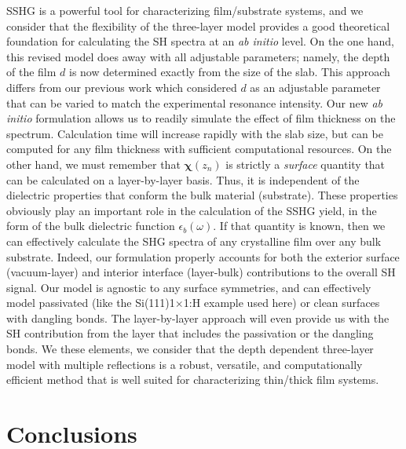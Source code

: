 \documentclass[utf8]{frontiersSCNS}
\begin{document}
SSHG is a powerful tool for characterizing film/substrate systems, and we
consider that the flexibility of the three-layer model provides a good
theoretical foundation for calculating the SH spectra at an \emph{ab initio}
level. On the one hand, this revised model does away with all adjustable
parameters; namely, the depth of the film $d$ is now determined exactly from the
size of the slab. This approach differs from our previous work
\citep{andersonPRB16b} which considered $d$ as an adjustable parameter that can
be varied to match the experimental resonance intensity. Our new \emph{ab
initio} formulation allows us to readily simulate the effect of film thickness
on the spectrum. Calculation time will increase rapidly with the slab size, but
can be computed for any film thickness with sufficient computational resources.
On the other hand, we must remember that $\boldsymbol{\chi}(z_{n})$ is strictly
a \emph{surface} quantity that can be calculated on a layer-by-layer basis.
Thus, it is independent of the dielectric properties that conform the bulk
material (substrate). These properties obviously play an important role in the
calculation of the SSHG yield, in the form of the bulk dielectric function
$\epsilon_{b}(\omega)$. If that quantity is known, then we can effectively
calculate the SHG spectra of any crystalline film over any bulk substrate.
Indeed, our formulation properly accounts for both the exterior surface
(vacuum-layer) and interior interface (layer-bulk) contributions to the overall
SH signal. Our model is agnostic to any surface symmetries, and can effectively
model passivated (like the Si(111)1$\times$1:H example used here) or clean
surfaces with dangling bonds. The layer-by-layer approach will even provide us
with the SH contribution from the layer that includes the passivation or the
dangling bonds. We these elements, we consider that the depth dependent
three-layer model with multiple reflections is a robust, versatile, and
computationally efficient method that is well suited for characterizing
thin/thick film systems.



\section{Conclusions}\label{sec:conclusions}
\end{document}
